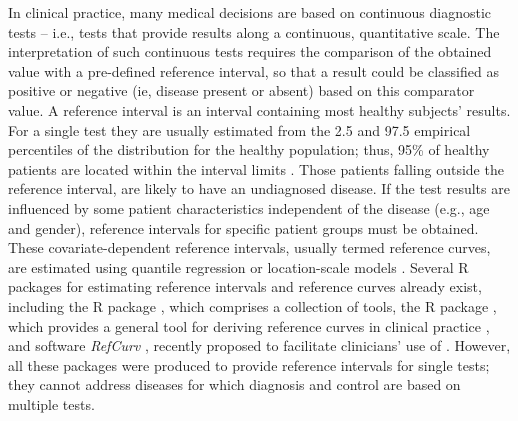 In clinical practice, many medical decisions are based on continuous diagnostic tests \citep{hallworth201170} – i.e., tests that provide results along a continuous, quantitative scale. The interpretation of such continuous tests requires the comparison of the obtained value with a pre-defined reference interval, so that a result could be classified as positive or negative (ie, disease present or absent) based on this comparator value. A reference interval is an interval containing most healthy subjects’ results. For a single test they are usually estimated from the 2.5 and 97.5 empirical percentiles of the distribution for the healthy population; thus, 95\% of healthy patients are located within the interval limits \citep{wright1999calculating}. Those patients falling outside the reference interval, are likely to have an undiagnosed disease. If the test results are influenced by some patient characteristics independent of the disease (e.g., age and gender), reference intervals for specific patient groups must be obtained. These covariate-dependent reference intervals, usually termed reference curves, are estimated using quantile regression \citep{koenker1978regression} or location-scale models \citep{cole1992smoothing,stasinopoulos2017flexible}. Several R packages for estimating reference intervals and reference curves already exist, including the R package  , which comprises a collection of tools, the R package  \citep{stasinopoulos2007generalized}, which provides a general tool for deriving reference curves in clinical practice  \citep{who_gamlss}, and software \textit{RefCurv} \citep{winkler2019refcurv}, recently proposed to facilitate clinicians' use of . However, all these packages were produced to provide reference intervals for single tests; they cannot address diseases for which diagnosis and control are based on multiple tests.

